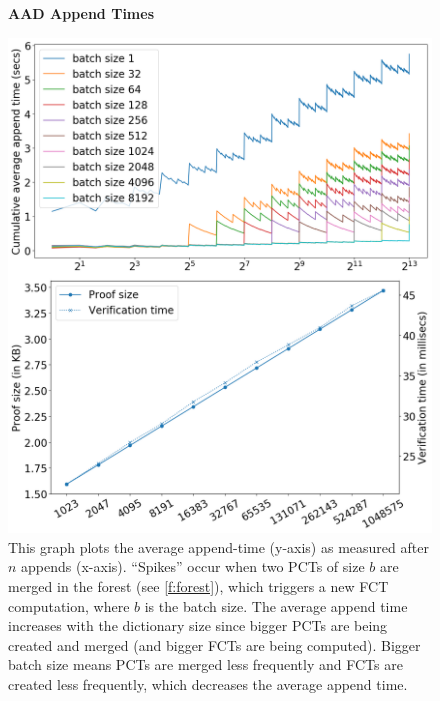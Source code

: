 \begin{figure}[t]
    \centering
    \textbf{AAD Append Times}\par\medskip
    \includegraphics[width=.90\columnwidth,trim={0 25cm 0 0},clip]{figures-aad/aad-merged-append-time-and-proof.png}
    \caption{
        This graph plots the average append-time (y-axis) as measured after $n$ appends (x-axis).
        ``Spikes'' occur when two PCTs of size $b$ are merged in the forest (see \cref{f:forest}), which triggers a new FCT computation, where $b$ is the batch size.
        The average append time increases with the dictionary size since bigger PCTs are being created and merged (and bigger FCTs are being computed).
        Bigger batch size means PCTs are merged less frequently and FCTs are created less frequently, which decreases the average append time.
    }
    \label{f:append-time}
\end{figure}

